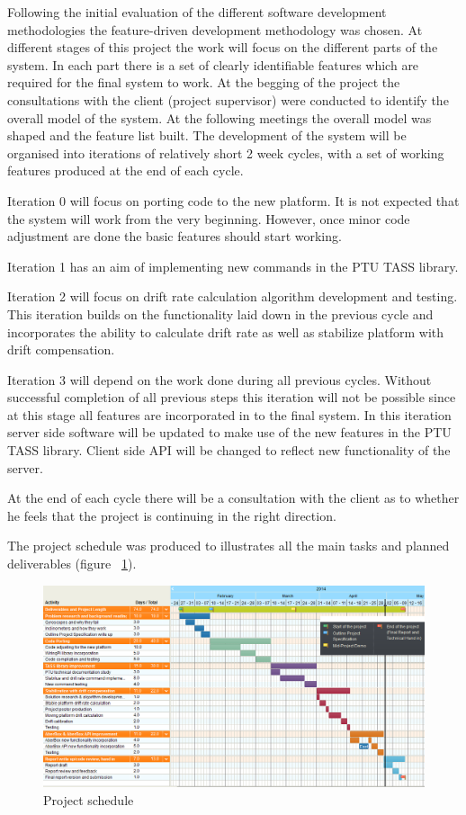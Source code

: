 Following the initial evaluation of the different software development methodologies the feature-driven development methodology was chosen. At different stages of this project the work will focus on the different parts of the system. In each part there is a set of clearly identifiable features which are required for the final system to work. At the begging of the project the consultations with the client (project supervisor) were conducted to identify the overall model of the system. At the following meetings the overall model was shaped and the feature list built. The development of the system will be organised into iterations of relatively short 2 week cycles, with a set of working features produced at the end of each cycle.

Iteration 0 will focus on porting code to the new platform. It is not expected that the system will work from the very beginning. However, once minor code adjustment are done the basic features should start working.

Iteration 1 has an aim of implementing new commands in the PTU TASS library.

Iteration 2 will focus on drift rate calculation algorithm development and testing. This iteration builds on the functionality laid down in the previous cycle and incorporates the ability to calculate drift rate as well as stabilize platform with drift compensation. 

Iteration 3 will depend on the work done during all previous cycles. Without successful completion of all previous steps this iteration will not be possible since at this stage all features are incorporated in to the final system. In this iteration server side software will be updated to make use of the new features in the PTU TASS library. Client side API will be changed to reflect new functionality of the server.

At the end of each cycle there will be a consultation with the client as to whether he feels that the project is continuing in the right direction.

The project schedule was produced to illustrates all the main tasks and planned deliverables (figure ~\ref{fig:ProjectSchedule}).

\begin{landscape}
\begin{figure}[H] 
\centering
\centerline{\includegraphics[scale=0.8]{./images/ProjectSchedule}}
\caption{Project schedule}
\label{fig:ProjectSchedule}
\end{figure}
\end{landscape}